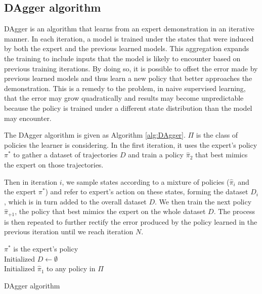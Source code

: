 \documentclass[twoside,11pt]{article}
\begin{document}
\subsection{DAgger algorithm}
DAgger is an algorithm that learns from an expert demonstration in an iterative manner. In each iteration, a model is trained under the states that were induced by both the expert and the previous learned models. This aggregation expands the training to include inputs that the model is likely to encounter based on previous training iterations. By doing so, it is possible to offset the error made by previous learned models and thus learn a new policy that better approaches the demonstration. This is a remedy to the problem, in naive supervised learning, that the error may grow quadratically and results may become unpredictable because the policy is trained under a different state distribution than the model may encounter. 

The DAgger algorithm is given as Algorithm \ref{alg:DAgger}. $\Pi$ is the class of policies the learner is considering. In the first iteration, it uses the expert's policy $\pi^*$ to gather a dataset of trajectories $D$ and train a policy $\hat{\pi}_2$ that best mimics the expert on those trajectories. 

Then in iteration $i$, we sample states according to a mixture of policies ($\hat{\pi}_i$ and the expert $\pi^*$) and refer to expert's action on these states, forming the dataset $D_i$, which is in turn added to the overall dataset $D$. We then train the next policy $\hat{\pi}_{+1}$, the policy that best mimics the expert on the whole dataset $D$. The process is then repeated to further rectify the error produced by the policy learned in the previous iteration until we reach iteration $N$.

\begin{algorithm}[htb]
 $\pi^*$  is the expert’s policy \\
 Initialized $D \leftarrow \emptyset$ \\
 Initialized $\hat{\pi}_1$ to any policy in $\Pi$ \\
 \caption{DAgger algorithm}
 \label{alg:DAgger}
\end{algorithm}
\end{document}
